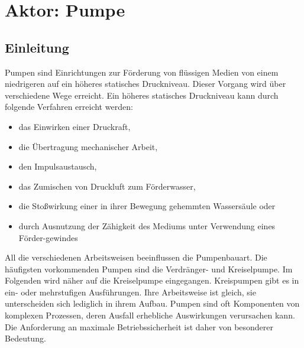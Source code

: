 \section{Aktor: Pumpe}
\subsection{Einleitung}
Pumpen sind Einrichtungen zur Förderung von flüssigen Medien von einem niedrigeren auf ein höheres statisches Druckniveau. Dieser Vorgang wird über verschiedene Wege erreicht. 
Ein höheres statisches Druckniveau kann durch folgende Verfahren erreicht werden: 
\begin{itemize}
	\item das Einwirken einer Druckraft, 
	\item die Übertragung mechanischer Arbeit, 
	\item den Impulsaustausch, 
	\item das Zumischen von Druckluft zum Förderwasser, 
	\item die Stoßwirkung einer in ihrer Bewegung gehemmten Wassersäule oder 
	\item durch Ausnutzung der Zähigkeit des Mediums unter Verwendung eines Förder-gewindes 
\end{itemize}
All die verschiedenen Arbeitsweisen beeinflussen die Pumpenbauart. Die häufigsten vorkommenden Pumpen sind die Verdränger- und Kreiselpumpe. 
Im Folgenden wird näher auf die Kreiselpumpe eingegangen. 
Kreispumpen gibt es in ein- oder mehrstufigen Ausführungen. Ihre Arbeitsweise ist gleich, sie unterscheiden sich lediglich in ihrem Aufbau.\cite{Schulz:2013}
Pumpen sind oft Komponenten von komplexen Prozessen, deren Ausfall erhebliche Auswirkungen verursachen kann. Die Anforderung an maximale Betriebssicherheit ist daher von besonderer Bedeutung.\cite{Gulich:2020}

